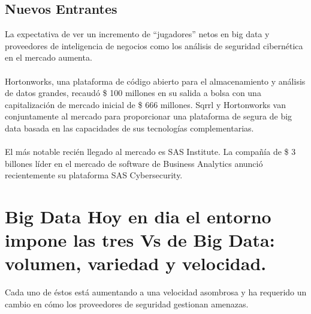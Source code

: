\documentclass[journal]{IEEEtran}
\begin{document}
\subsection{Nuevos Entrantes}
La expectativa de ver un incremento de “jugadores” netos en big data y proveedores de inteligencia de negocios como los análisis de seguridad cibernética en el mercado aumenta.\\ \\
Hortonworks, una plataforma de código abierto para el almacenamiento y análisis de datos grandes, recaudó \$ 100 millones en su salida a bolsa con una capitalización de mercado inicial de \$ 666 millones. Sqrrl y Hortonworks van conjuntamente al mercado para proporcionar una plataforma de segura de big data basada en las capacidades de sus tecnologías complementarias.\\ \\
El más notable recién llegado al mercado es SAS Institute. La compañía de \$ 3 billones líder en el mercado de software de Business Analytics anunció recientemente su plataforma SAS Cybersecurity.

\section{Big Data Hoy en dia el entorno impone las tres Vs de Big Data: volumen, variedad y velocidad.}
Cada uno de éstos está aumentando a una velocidad asombrosa y ha requerido un cambio en cómo los proveedores de seguridad gestionan amenazas.
\end{document}

